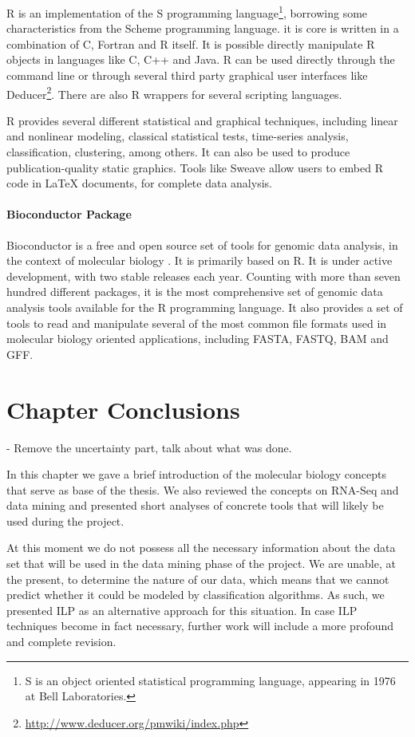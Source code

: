 R is an implementation of the S programming language\footnote{S is an object
oriented statistical programming language, appearing in 1976 at Bell
Laboratories.}, borrowing some characteristics from the Scheme programming
language. it is core is written in a combination of C, Fortran and R itself. It
is possible directly manipulate R objects in languages like C, C++ and Java. R
can be used directly through the command line or through several third party
graphical user interfaces like
Deducer\footnote{\url{http://www.deducer.org/pmwiki/index.php}}. There are also
R wrappers for several scripting languages.

R provides several different statistical and graphical techniques, including
linear and nonlinear modeling, classical statistical tests, time-series
analysis, classification, clustering, among others. It can also be used to
produce publication-quality static graphics. Tools like Sweave
\cite{lmucs-papers:Leisch:2002} allow users to embed R code in \LaTeX{}
documents, for complete data analysis.

\paragraph{Bioconductor Package}

Bioconductor is a free and open source set of tools for genomic data analysis,
in the context of molecular biology \cite{lmucs-papers:Leisch:2002}. It is
primarily based on R. It is under active development, with two stable releases
each year. Counting with more than seven hundred different packages, it is the
most comprehensive set of genomic data analysis tools available for the R
programming language. It also provides a set of tools to read and manipulate
several of the most common file formats used in molecular biology oriented
applications, including FASTA, FASTQ, BAM and GFF.

\section{Chapter Conclusions}

\begin{Notes}
- Remove the uncertainty part, talk about what was done.\\
\end{Notes}

In this chapter we gave a brief introduction of the molecular biology concepts
that serve as base of the thesis. We also reviewed the concepts on RNA-Seq and
data mining and presented short analyses of concrete tools that will likely be
used during the project.

At this moment we do not possess all the necessary information about the data
set that will be used in the data mining phase of the project. We are unable, at
the present, to determine the nature of our data, which means that we cannot
predict whether it could be modeled by classification algorithms. As such, we
presented ILP as an alternative approach for this situation. In case ILP
techniques become in fact necessary, further work will include a more profound
and complete revision.

